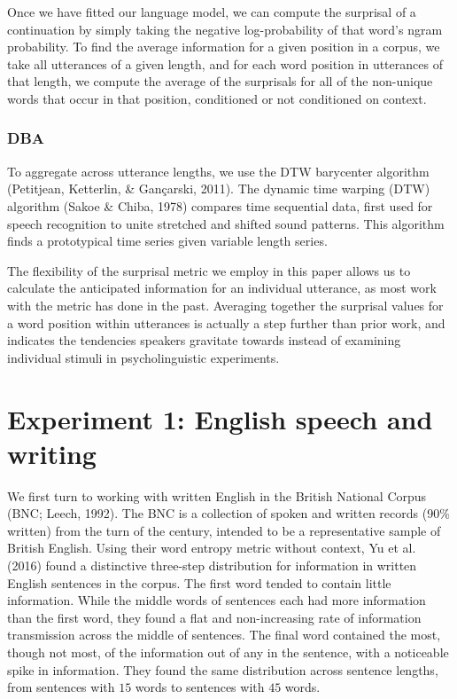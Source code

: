 \documentclass[10pt, letterpaper]{article}
\begin{document}
Once we have fitted our language model, we can compute the surprisal of
a continuation by simply taking the negative log-probability of that
word's ngram probability. To find the average information for a given
position in a corpus, we take all utterances of a given length, and for
each word position in utterances of that length, we compute the average
of the surprisals for all of the non-unique words that occur in that
position, conditioned or not conditioned on context.

\hypertarget{dba}{%
\subsubsection{DBA}\label{dba}}

To aggregate across utterance lengths, we use the DTW barycenter
algorithm (Petitjean, Ketterlin, \& Gançarski, 2011). The dynamic time
warping (DTW) algorithm (Sakoe \& Chiba, 1978) compares time sequential
data, first used for speech recognition to unite stretched and shifted
sound patterns. This algorithm finds a prototypical time series given
variable length series.

The flexibility of the surprisal metric we employ in this paper allows
us to calculate the anticipated information for an individual utterance,
as most work with the metric has done in the past. Averaging together
the surprisal values for a word position within utterances is actually a
step further than prior work, and indicates the tendencies speakers
gravitate towards instead of examining individual stimuli in
psycholinguistic experiments.

\hypertarget{experiment-1-english-speech-and-writing}{%
\section{Experiment 1: English speech and
writing}\label{experiment-1-english-speech-and-writing}}

We first turn to working with written English in the British National
Corpus (BNC; Leech, 1992). The BNC is a collection of spoken and written
records (90\% written) from the turn of the century, intended to be a
representative sample of British English. Using their word entropy
metric without context, Yu et al. (2016) found a distinctive three-step
distribution for information in written English sentences in the corpus.
The first word tended to contain little information. While the middle
words of sentences each had more information than the first word, they
found a flat and non-increasing rate of information transmission across
the middle of sentences. The final word contained the most, though not
most, of the information out of any in the sentence, with a noticeable
spike in information. They found the same distribution across sentence
lengths, from sentences with \(15\) words to sentences with \(45\)
words.
\end{document}
